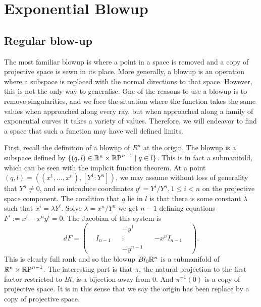 \section{Exponential Blowup}
\label{sec:Exponential Blowup}

\subsection{Regular blow-up}
\label{sub:Regular blow-up}

The most familiar blowup is where a point in a space is removed and a copy of projective space is sewn in its place. More generally, a blowup is an operation where a subspace is replaced with the normal directions to that space. However, this is not the only way to generalise. One of the reasons to use a blowup is to remove singularities, and we face the situation where the function takes the same values when approached along every ray, but when approached along a family of exponential curves it takes a variety of values. Therefore, we will endeavor to find a space that such a function may have well defined limits.

First, recall the definition of a blowup of $R^n$ at the origin. The blowup is a subspace defined by $\{ (q, l) \in \mathbb{R}^n \times \mathbb{R}\text{P}^{n-1} \mid q \in l \}$. This is in fact a submanifold, which can be seen with the implicit function theorem. At a point $(q,l) = ((x^1,\dots,x^n),[Y^1:Y^n])$, we may assume without loss of generality that $Y^n \neq 0$, and so introduce coordinates $y^i = Y^i / Y^n, 1\leq i < n$ on the projective space component. The condition that $q$ lie in $l$ is that there is some constant $λ$ such that $x^i = λ Y^i$. Solve $λ = x^n / Y^n$ we get $n-1$ defining equations $F^i := x^i - x^n y^i = 0$. The Jacobian of this system is
\[
dF =
\left(\begin{array}{ccc|c|ccc}
    &           &   & -y^1      &   &               & \\
    & I_{n-1}   &   & \vdots    &   & -x^n I_{n-1}  & \\
    &           &   & -y^{n-1}  &   &               &
\end{array}\right).
\]
This is clearly full rank and so the blowup $Bl_0 \mathbb{R}^n$ is a submanifold of $\mathbb{R}^n \times \mathbb{R}\text{P}^{n-1}$. The interesting part is that $π$, the natural projection to the first factor restricted to $Bl$, is a bijection away from $0$. And $π^{-1}(0)$ is a copy of projective space. It is in this sense that we say the origin has been replace by a copy of projective space.

